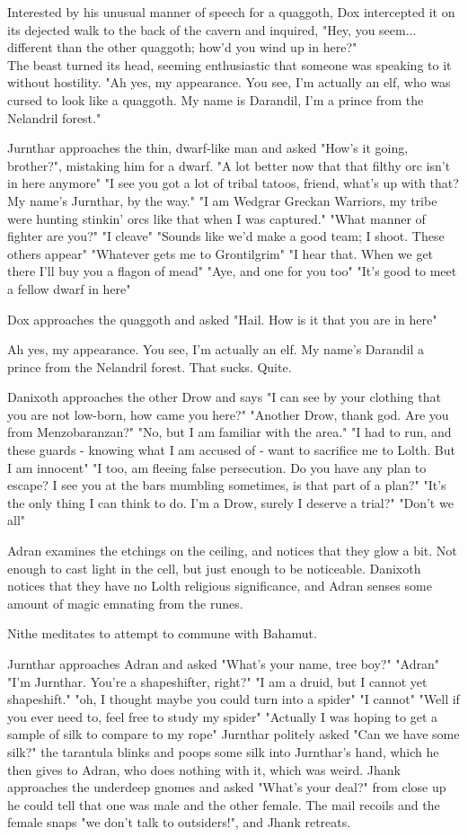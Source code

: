 \documentclass[letterpaper,10pt,twoside,twocolumn,openany]{book}
\begin{document}
Interested by his unusual manner of speech for a quaggoth, Dox intercepted it on its dejected walk to the back of the cavern and inquired, "Hey, you seem... different than the other quaggoth; how'd you wind up in here?"\\
The beast turned its head, seeming enthusiastic that someone was speaking to it without hostility. "Ah yes, my appearance. You see, I'm actually an elf, who was cursed to look like a quaggoth. My name is Darandil, I'm a prince from the Nelandril forest."

Jurnthar approaches the thin, dwarf-like man and asked "How's it going, brother?", mistaking him for a dwarf. "A lot better now that that filthy orc isn't in here anymore"
"I see you got a lot of tribal tatoos, friend, what's up with that? My name's Jurnthar, by the way."
"I am Wedgrar Greckan Warriors, my tribe were hunting stinkin' orcs like that when I was captured."
"What manner of fighter are you?"
"I cleave"
"Sounds like we'd make a good team; I shoot. These others appear"
"Whatever gets me to Grontilgrim"
"I hear that. When we get there I'll buy you a flagon of mead"
"Aye, and one for you too"
"It's good to meet a fellow dwarf in here"

Dox approaches the quaggoth and asked "Hail. How is it that you are in here"

Ah yes, my appearance. You see, I'm actually an elf. My name's Darandil a prince from the Nelandril forest.
That sucks.
Quite.

Danixoth approaches the other Drow and says "I can see by your clothing that you are not low-born, how came you here?"
"Another Drow, thank god. Are you from Menzobaranzan?"
"No, but I am familiar with the area."
"I had to run, and these guards - knowing what I am accused of - want to sacrifice me to Lolth. But I am innocent"
"I too, am fleeing false persecution. Do you have any plan to escape? I see you at the bars mumbling sometimes, is that part of a plan?"
"It's the only thing I can think to do. I'm a Drow, surely I deserve a trial?"
"Don't we all"

Adran examines the etchings on the ceiling, and notices that they glow a bit. Not enough to cast light in the cell, but just enough to be noticeable. Danixoth notices that they have no Lolth religious significance, and Adran senses some amount of magic emnating from the runes. 

Nithe meditates to attempt to commune with Bahamut.

Jurnthar approaches Adran and asked "What's your name, tree boy?" "Adran" "I'm Jurnthar. You're a shapeshifter, right?" "I am a druid, but I cannot yet shapeshift." "oh, I thought maybe you could turn into a spider" "I cannot" "Well if you ever need to, feel free to study my spider" "Actually I was hoping to get a sample of silk to compare to my rope" Jurnthar politely asked "Can we have some silk?" the tarantula blinks and poops some silk into Jurnthar's hand, which he then gives to Adran, who does nothing with it, which was weird. Jhank approaches the underdeep gnomes and asked "What's your deal?" from close up he could tell that one was male and the other female. The mail recoils and the female snaps "we don't talk to outsiders!", and Jhank retreats.
\end{document}
